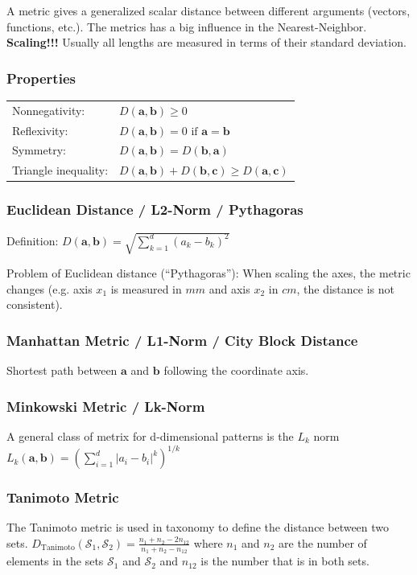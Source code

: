     A metric gives a generalized scalar distance between different arguments (vectors, functions, etc.). 
    The metrics has  a big influence in the Nearest-Neighbor. \textbf{Scaling!!!}
    Usually all lengths are measured in terms of their standard deviation.
  
  \begin{multicols}{2}

    
    \subsubsection{Properties}
    \begin{tabular}{ll}
      Nonnegativity: &$D(\bm a, \bm b) \geq 0$  \\
      Reflexivity:   &$D(\bm a, \bm b) = 0 \text{ if } \bm a = \bm b$\\
      Symmetry:      &$D(\bm a, \bm b)=D(\bm b, \bm a)$  \\
      Triangle inequality: & $D(\bm a, \bm b) + D(\bm b, \bm c) \geq D(\bm a, \bm c)$
    \end{tabular}
    
    \subsubsection{Euclidean Distance / L2-Norm / Pythagoras}
      Definition: $D(\bm a, \bm b) = \sqrt{\sum\limits_{k=1}^d (a_k - b_k)^2}$
      
      Problem of Euclidean distance (``Pythagoras''): When scaling the axes, the metric changes (e.g. 
      axis $x_1$ is measured in $mm$ and axis $x_2$ in $cm$, the distance is not consistent).
      
      
    \subsubsection{Manhattan Metric / L1-Norm / City Block Distance}
      Shortest path between $\bm a$ and $\bm b$ following the coordinate axis.
    
    \subsubsection{Minkowski Metric / Lk-Norm}
	A general class of metrix for d-dimensional patterns is the $L_k$ norm
	$L_k(\mathbf{a},\mathbf{b}) = \left(\sum\limits_{i=1}^{d} \left| a_i-b_i \right|^k \right)^{1/k}$
    
    \subsubsection{Tanimoto Metric}
	The Tanimoto metric is used in taxonomy to define the distance between two sets.
	$D_{\mathrm{Tanimoto}}(\mathcal{S}_1,\mathcal{S}_2) = \frac{n_1 + n_2 - 2 n_{12}}{n_1 + n_2 - n_{12}}$
	where $n_1$ and $n_2$ are the number of elements in the sets $\mathcal{S}_1$ and $\mathcal{S}_2$ 
	and $n_{12}$ is the number that is in both sets.
    

\end{multicols}
